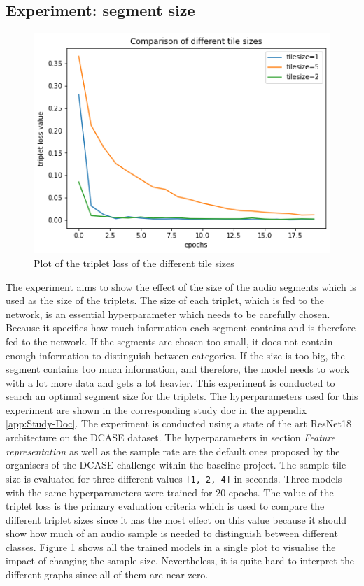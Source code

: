 \subsection{Experiment: segment size}
\begin{figure}[tb]
\centering
    \includegraphics[width=0.5\linewidth]{study-doc/experiment_tile_size/assets/tile_sizes_plot.png}
    \caption{Plot of the triplet loss of the different tile sizes}
    \label{fig:tile-size-plot}
\end{figure}
\noindent
The experiment aims to show the effect of the size of the audio segments which is used as the size of the triplets. The size of each triplet, which is fed to the network, is an essential hyperparameter which needs to be carefully chosen. Because it specifies how much information each segment contains and is therefore fed to the network. If the segments are chosen too small, it does not contain enough information to distinguish between categories. If the size is too big, the segment contains too much information, and therefore, the model needs to work with a lot more data and gets a lot heavier. This experiment is conducted to search an optimal segment size for the triplets.
\newline
\newline
The hyperparameters used for this experiment are shown in the corresponding study doc in the appendix \ref{app:Study-Doc}. The experiment is conducted using a state of the art ResNet18 architecture on the DCASE dataset. The hyperparameters in section \textit{Feature representation} as well as the sample rate are the default ones proposed by the organisers of the DCASE challenge within the baseline project. The sample tile size is evaluated for three different values \texttt{[1, 2, 4]} in seconds.
\newline
\newline
Three models with the same hyperparameters were trained for 20 epochs. The value of the triplet loss is the primary evaluation criteria which is used to compare the different triplet sizes since it has the most effect on this value because it should show how much of an audio sample is needed to distinguish between different classes. Figure \ref{fig:tile-size-plot} shows all the trained models in a single plot to visualise the impact of changing the sample size. Nevertheless, it is quite hard to interpret the different graphs since all of them are near zero.
